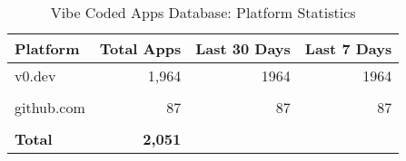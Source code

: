 \begin{table}[htbp]
\centering
\caption{Vibe Coded Apps Database: Platform Statistics}
\label{tab:vibe-coded-apps-stats}
\begin{tabular}{lrrr}
\toprule
Platform & Total Apps & Last 30 Days & Last 7 Days \\
\midrule
v0.dev & 1,964 & 1964 & 1964 \\\\
github.com & 87 & 87 & 87 \\\\
\midrule
\textbf{Total} & \textbf{2,051} & & \\
\bottomrule
\end{tabular}
\end{table}